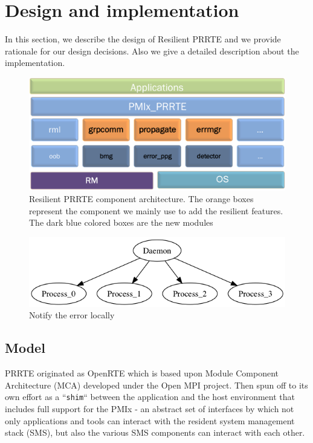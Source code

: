 \documentclass[sigconf]{acmart}
\begin{document}
\section{Design and implementation}

In this section, we describe the design of Resilient PRRTE and we provide rationale for our design decisions. Also we give a detailed description about the implementation.

\begin{figure}[h]
  \centering
  \includegraphics[width=\linewidth]{PMIx_PRRTE.png}
  \caption{Resilient PRRTE component architecture. The orange boxes represent the component we mainly use to add the resilient features. The dark blue colored boxes are the new modules}
\end{figure}

\begin{figure}[h]
  \centering
  \includegraphics[width=\linewidth]{test.png}
  \caption{Notify the error locally}
\end{figure}
\subsection{Model}
PRRTE originated as OpenRTE \cite{Castain05} which is based upon Module Component Architecture (MCA) developed under the Open MPI project. Then spun off to its own effort as a ``\verb|shim|`` between the application and the host environment that includes full support for the PMIx \cite{CASTAIN18} - an abstract set of interfaces by which not only applications and tools can interact with the resident system management stack (SMS), but also the various SMS components can interact with each other. 
\end{document}
